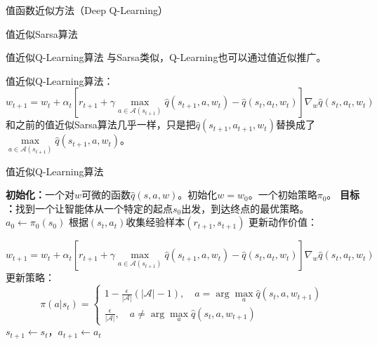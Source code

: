 \begin{section}{值函数近似方法\alert{（Deep Q-Learning）}}
\begin{frame}{值近似Sarsa算法}
\end{frame}

\begin{frame}{值近似Q-Learning算法}
    与Sarsa类似，Q-Learning也可以通过值近似推广。

    值近似Q-Learning算法：
    \alert{\[
        w_{t+1}=w_t+\alpha_t\left[r_{t+1}+\gamma \underset{a\in \mathcal{A}(s_{t+1})}{\max}\hat{q}(s_{t+1},a,w_t)-\hat{q}(s_t,a_t,w_t)\right]\nabla_w\hat{q}(s_t,a_t,w_t)
    \]}
    和之前的值近似Sarsa算法几乎一样，只是把$\hat{q}(s_{t+1},a_{t+1},w_t)$替换成了$\underset{a\in \mathcal{A}(s_{t+1})}{\max}\hat{q}(s_{t+1},a,w_t)$。
\end{frame}

\begin{frame}{值近似Q-Learning算法}
    \begin{algorithmic}[1]
        \State \textbf{初始化：}一个对$w$可微的函数$\hat{q}(s,a,w)$。初始化$w=w_0$。一个初始策略$\pi_0$。
        \State \textbf{目标 ：}找到一个让智能体从一个特定的起点$s_0$出发，到达终点的最优策略。
            \State $a_0\leftarrow\pi_0(s_0)$
                \State 根据$(s_t,a_t)$收集经验样本$(r_{t+1}, s_{t+1})$
                \State 更新动作价值：

                $w_{t+1}=w_t+\alpha_t[r_{t+1}+\gamma \underset{a\in \mathcal{A}(s_{t+1})}{\max}\hat{q}(s_{t+1},a,w_t)-\hat{q}(s_t,a_t,w_t)]\nabla_w\hat{q}(s_t,a_t,w_t)$
                \State 更新策略：
                \[
                    \pi(a|s_t)=\begin{cases}
                        1-\frac{\epsilon}{|\mathcal{A}|}(|\mathcal{A}|-1),\quad a=\arg\max_{a}\hat{q}(s_t,a,w_{t+1}) \\
                        \frac{\epsilon}{|\mathcal{A}|},\quad a \neq \arg\max_{a}\hat{q}(s_t,a,w_{t+1})
                    \end{cases}
                \]
                \State $s_{t+1}\leftarrow s_t$，$a_{t+1}\leftarrow a_t$
            \EndWhile
        \EndFor
    \end{algorithmic}
\end{frame}


\end{section}

